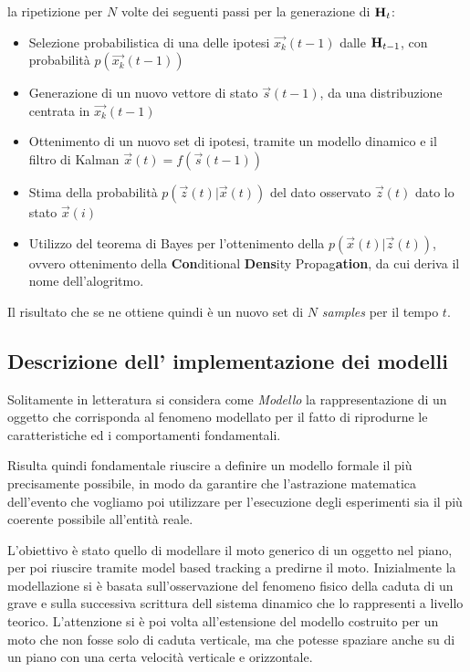 la ripetizione per $N$ volte dei seguenti passi per la generazione di $\mbox{{\bfseries H}}_t$:
\begin{itemize}
\item Selezione probabilistica di una delle ipotesi $\overrightarrow{x_k}(t-1)$ dalle $\mbox{{\bfseries H}}_{t-1}$, con probabilità $p(\overrightarrow{x_k}(t-1))$
\item Generazione di un nuovo vettore di stato $\overrightarrow{s}(t-1)$, da una distribuzione centrata in   $\overrightarrow{x_k}(t-1)$
\item Ottenimento di un nuovo set di ipotesi, tramite un modello dinamico e il filtro di Kalman $\overrightarrow{x}(t)=f(\overrightarrow{s}(t-1))$
\item Stima della probabilità $p(\overrightarrow{z}(t)|\overrightarrow{x}(t))$ del dato osservato $\overrightarrow{z}(t)$ dato lo stato $\overrightarrow{x}(i)$
\item Utilizzo del teorema di Bayes per l'ottenimento della $p(\overrightarrow{x}(t)|\overrightarrow{z}(t))$, ovvero ottenimento della \textbf{Con}ditional \textbf{Dens}ity Propag\textbf{ation}, da cui deriva il nome dell'alogritmo.
\end{itemize}

Il risultato che se ne ottiene quindi è un nuovo set di $N$ \textit{samples} per il tempo $t$.
\subsection{Descrizione dell' implementazione dei modelli} \label{sec:modelli}
Solitamente in letteratura si considera come \textit{Modello} la rappresentazione di un oggetto che corrisponda al fenomeno modellato per il fatto  di riprodurne le caratteristiche ed i comportamenti fondamentali. 

Risulta quindi fondamentale riuscire a definire un modello formale il più precisamente possibile, in modo da garantire che l'astrazione matematica dell'evento che vogliamo poi utilizzare per l'esecuzione degli esperimenti sia il più coerente possibile all'entità reale. 

L'obiettivo è stato quello di modellare il moto generico di un oggetto nel piano, per poi riuscire tramite model based tracking a predirne il moto. Inizialmente la modellazione si è basata sull'osservazione del fenomeno fisico della caduta di un grave e sulla successiva scrittura dell sistema dinamico che lo rappresenti a livello teorico. L'attenzione si è poi volta all'estensione del modello costruito per un moto che non fosse solo di caduta verticale, ma che potesse spaziare anche su di un piano con una certa velocità verticale e orizzontale. 

